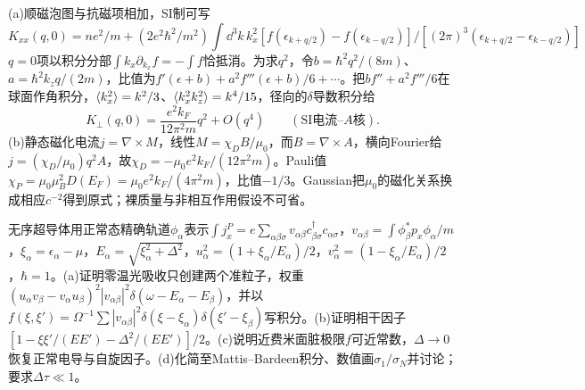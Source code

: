 \begin{solution}
(a)顺磁泡图与抗磁项相加，SI制可写
\begin{equation}
K_{xx}(q,0)=ne^2/m+(2e^2\hbar^2/m^2)\int\dd^3k\,k_x^2[f(\epsilon_{k+q/2})-f(\epsilon_{k-q/2})]/[(2\pi)^3(\epsilon_{k+q/2}-\epsilon_{k-q/2})]
\end{equation}
$q=0$项以积分分部$\int k_x\partial_{k_x}f=-\int f$恰抵消。为求$q^2$，令$b=\hbar^2q^2/(8m)$、$a=\hbar^2k_zq/(2m)$，比值为$f'(\epsilon+b)+a^2f'''(\epsilon+b)/6+\cdots$。把$b f''+a^2f'''/6$在球面作角积分，$\langle k_x^2\rangle=k^2/3$、$\langle k_x^2k_z^2\rangle=k^4/15$，径向的$\delta$导数积分给
\begin{equation}
K_\perp(q,0)=\frac{e^2k_F}{12\pi^2m}q^2+O(q^4)\qquad(\text{SI电流--}A\text{核}).
\end{equation}
(b)静态磁化电流$j=\nabla\times M$，线性$M=\chi_DB/\mu_0$，而$B=\nabla\times A$，横向Fourier给$j=(\chi_D/\mu_0)q^2A$，故$\chi_D=-\mu_0e^2k_F/(12\pi^2m)$。Pauli值$\chi_P=\mu_0\mu_B^2D(E_F)=\mu_0e^2k_F/(4\pi^2m)$，比值$-1/3$。Gaussian把$\mu_0$的磁化关系换成相应$c^{-2}$得到原式；裸质量与非相互作用假设不可省。
\end{solution}
\begin{exercise}[原题1(a)--(d)]\label{p:512-7-1}
无序超导体用正常态精确轨道$\phi_\alpha$表示$\int j_x^P=e\sum_{\alpha\beta\sigma}v_{\alpha\beta}c_{\beta\sigma}^\dagger c_{\alpha\sigma}$，$v_{\alpha\beta}=\int\phi_\beta^*p_x\phi_\alpha/m$，$\xi_\alpha=\epsilon_\alpha-\mu$，$E_\alpha=\sqrt{\xi_\alpha^2+\Delta^2}$，$u_\alpha^2=(1+\xi_\alpha/E_\alpha)/2$，$v_\alpha^2=(1-\xi_\alpha/E_\alpha)/2$，$\hbar=1$。(a)证明零温光吸收只创建两个准粒子，权重$(u_\alpha v_\beta-v_\alpha u_\beta)^2|v_{\alpha\beta}|^2\delta(\omega-E_\alpha-E_\beta)$，并以$f(\xi,\xi')=\Omega^{-1}\sum|v_{\alpha\beta}|^2\delta(\xi-\xi_\alpha)\delta(\xi'-\xi_\beta)$写积分。(b)证明相干因子$[1-\xi\xi'/(EE')-\Delta^2/(EE')]/2$。(c)说明近费米面脏极限$f$可近常数，$\Delta\to0$恢复正常电导与自旋因子。(d)化简至Mattis--Bardeen积分、数值画$\sigma_1/\sigma_N$并讨论；要求$\Delta\tau\ll1$。
\end{exercise}
